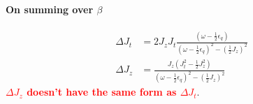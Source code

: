 \documentclass[14pt]{extarticle}
\newcommand{\qs}[1]{\textbf{{\textcolor{red}{#1}}}}
\numberwithin{equation}{section}
\begin{document}
\paragraph{On summing over $\beta$}
\begin{align}
  \Delta J_t  &= 2 J_zJ_t \frac{\left( \omega - \frac{1}{2}\epsilon_q \right)}{\left( \omega - \frac{1}{2}\epsilon_q \right)^2 - \left( \frac{1}{2} J_z \right)^2}   \label{eq:21} \\
\Delta J_z  &= \frac{J_z \left( J_t^2 - \frac{1}{2} J_z^2 \right)}{\left( \omega - \frac{1}{2}\epsilon_q \right)^2 - \left( \frac{1}{2} J_z \right)^2}
\end{align}
\hypertarget{qs3}{\qs{$\Delta J_z$ doesn't have the same form as $\Delta J_t$}}.

\end{document}
